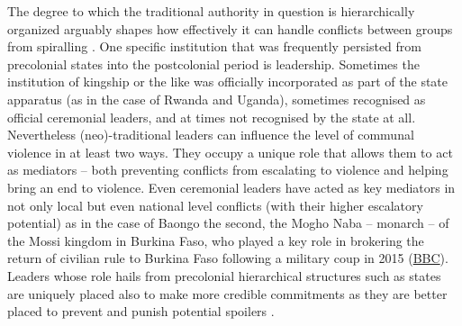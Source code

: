 The degree to which the traditional authority in question is hierarchically
organized arguably shapes how effectively it can handle conflicts between groups
from spiralling \citep[46]{Wig2018}. One specific institution that was
frequently persisted from precolonial states into the postcolonial period is
leadership. Sometimes the institution of kingship or the like was officially
incorporated as part of the state apparatus (as in the case of Rwanda and
Uganda), sometimes recognised as official ceremonial leaders, and at times not
recognised by the state at all. Nevertheless (neo)-traditional leaders can
influence the level of communal violence in at least two ways. They occupy a
unique role that allows them to act as mediators -- both preventing conflicts
from escalating to violence and helping bring an end to violence. Even
ceremonial leaders have acted as key mediators in not only local but even
national level conflicts (with their higher escalatory potential) as in the case
of Baongo the second, the Mogho Naba -- monarch -- of the Mossi kingdom in
Burkina Faso, who played a key role in brokering the return of civilian rule to
Burkina Faso following a military coup in 2015
(\href{https://www.bbc.com/news/world-africa-34340704}{BBC}). Leaders whose role
hails from precolonial hierarchical structures such as states are uniquely
placed also to make more credible commitments as they are better placed to
prevent and punish potential spoilers \citep{Wig2016}.

% 

